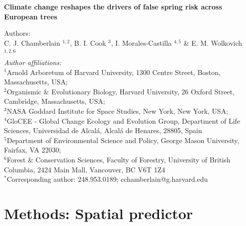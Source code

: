 \documentclass{article}\usepackage[]{graphicx}\usepackage[]{color}
\begin{document}
\noindent 
\textbf{\LARGE{Climate change reshapes the drivers of false spring risk across European trees}} 



\noindent Authors:\\
C. J. Chamberlain $^{1,2}$, B. I. Cook $^{3}$, I. Morales-Castilla $^{4,5}$ \& E. M. Wolkovich $^{1,2,6}$
\vspace{2ex}\\
\emph{Author affiliations:}\\
$^{1}$Arnold Arboretum of Harvard University, 1300 Centre Street, Boston, Massachusetts, USA; \\
$^{2}$Organismic \& Evolutionary Biology, Harvard University, 26 Oxford Street, Cambridge, Massachusetts, USA; \\
$^{3}$NASA Goddard Institute for Space Studies, New York, New York, USA; \\
$^{4}$GloCEE - Global Change Ecology and Evolution Group, Department of Life Sciences, Universidad de Alcal\'{a}, Alcal\'{a} de Henares, 28805, Spain \\
$^{5}$Department of Environmental Science and Policy, George Mason University, Fairfax, VA 22030; \\
$^{6}$Forest \& Conservation Sciences, Faculty of Forestry, University of British Columbia, 2424 Main Mall, Vancouver, BC V6T 1Z4\\
\vspace{2ex}
$^*$Corresponding author: 248.953.0189; cchamberlain@g.harvard.edu\\

\renewcommand{\thetable}{S\arabic{table}}
\renewcommand{\thefigure}{S\arabic{figure}}
\renewcommand{\labelitemi}{$-$}

\section*{Methods: Spatial predictor} %
\end{document}
